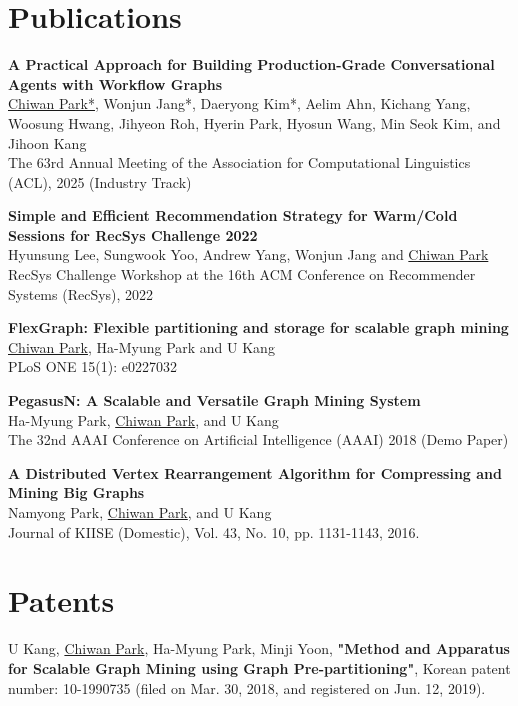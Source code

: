 \documentclass[11pt,a4paper]{article}
\newenvironment{entry}{
  \begin{list}{}{
    \setlength{\leftmargin}{0em}
    \setlength{\itemsep}{0.25em}
    \setlength{\parskip}{0pt}
    \setlength{\parsep}{0.25em}
  }
}{
  \end{list}
}
\begin{document}
\section*{Publications}
\begin{entry}
  \item \textbf{A Practical Approach for Building Production-Grade Conversational Agents with Workflow Graphs}\\
  \underline{Chiwan Park*}, Wonjun Jang*, Daeryong Kim*, Aelim Ahn, Kichang Yang, Woosung Hwang, Jihyeon Roh, Hyerin Park, Hyosun Wang, Min Seok Kim, and Jihoon Kang\\
  The 63rd Annual Meeting of the Association for Computational Linguistics (ACL), 2025 (Industry Track)
  \item \textbf{Simple and Efficient Recommendation Strategy for Warm/Cold Sessions for RecSys Challenge 2022}\\
  Hyunsung Lee, Sungwook Yoo, Andrew Yang, Wonjun Jang and \underline{Chiwan Park}\\
  RecSys Challenge Workshop at the 16th ACM Conference on Recommender Systems (RecSys), 2022
  \item \textbf{FlexGraph: Flexible partitioning and storage for scalable graph mining}\\
  \underline{Chiwan Park}, Ha-Myung Park and U Kang\\
  PLoS ONE 15(1): e0227032
  \item \textbf{PegasusN: A Scalable and Versatile Graph Mining System}\\
  Ha-Myung Park, \underline{Chiwan Park}, and U Kang\\
  The 32nd AAAI Conference on Artificial Intelligence (AAAI) 2018 (Demo Paper)
  \item \textbf{A Distributed Vertex Rearrangement Algorithm for Compressing and Mining Big Graphs}\\
  Namyong Park, \underline{Chiwan Park}, and U Kang\\
  Journal of KIISE (Domestic), Vol. 43, No. 10, pp. 1131-1143, 2016.
\end{entry}

\section*{Patents}
\begin{entry}
  \item U Kang, \underline{Chiwan Park}, Ha-Myung Park, Minji Yoon, \textbf{"Method and Apparatus for Scalable Graph Mining using Graph Pre-partitioning"}, Korean patent number: 10-1990735 (filed on Mar. 30, 2018, and registered on Jun. 12, 2019).
\end{entry}
\end{document}
